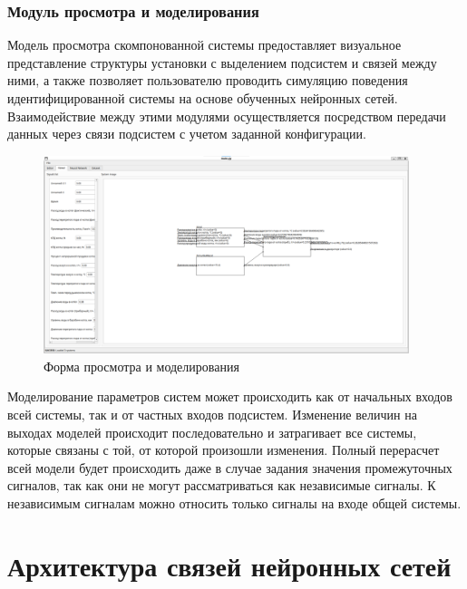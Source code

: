 \subsubsection{Модуль просмотра и моделирования}

Модель просмотра скомпонованной системы предоставляет визуальное представление
структуры установки с выделением подсистем и связей между ними, а также
позволяет пользователю проводить симуляцию поведения идентифицированной системы
на основе обученных нейронных сетей. Взаимодействие между этими модулями
осуществляется посредством передачи данных через связи подсистем с учетом
заданной конфигурации.

\begin{figure}[H]
  \begin{center}
    \includegraphics[width=0.95\textwidth]{figures/modules/modelling.png}
  \end{center}
  \caption{Форма просмотра и моделирования}\label{fig:forms:viewer}
\end{figure}

Моделирование параметров систем может происходить как от начальных входов всей
системы, так и от частных входов подсистем. Изменение величин на выходах
моделей происходит последовательно и затрагивает все системы, которые связаны с
той, от которой произошли изменения.
Полный перерасчет всей модели будет происходить даже в случае задания значения
промежуточных сигналов, так как они не могут рассматриваться как независимые
сигналы. К независимым сигналам можно относить только сигналы на входе общей
системы.

\section{Архитектура связей нейронных сетей}

